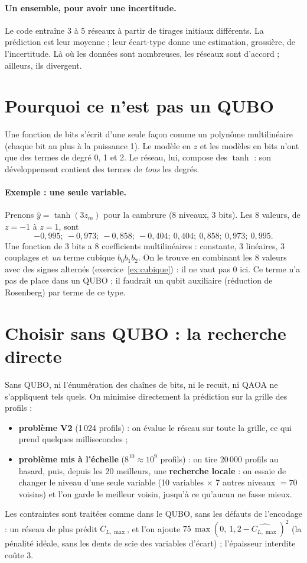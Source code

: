 \paragraph{Un ensemble, pour avoir une incertitude.} Le code entraîne 3 à 5 réseaux à partir de tirages initiaux différents. La prédiction est leur moyenne ; leur écart-type donne une estimation, grossière, de l'incertitude. Là où les données sont nombreuses, les réseaux sont d'accord ; ailleurs, ils divergent.

\section{Pourquoi ce n'est pas un QUBO}
Une fonction de bits s'écrit d'une seule façon comme un polynôme multilinéaire (chaque bit au plus à la puissance 1). Le modèle en $z$ et les modèles en bits n'ont que des termes de degré 0, 1 et 2. Le réseau, lui, compose des $\tanh$ : son développement contient des termes de \emph{tous} les degrés.

\paragraph{Exemple : une seule variable.} Prenons $\hat y=\tanh(3z_m)$ pour la cambrure (8 niveaux, 3 bits). Les 8 valeurs, de $z=-1$ à $z=1$, sont
\[ -0{,}995;\ -0{,}973;\ -0{,}858;\ -0{,}404;\ 0{,}404;\ 0{,}858;\ 0{,}973;\ 0{,}995. \]
Une fonction de 3 bits a 8 coefficients multilinéaires : constante, 3 linéaires, 3 couplages et \emph{un} terme cubique $b_0b_1b_2$. On le trouve en combinant les 8 valeurs avec des signes alternés (exercice~\ref{ex:cubique}) : il ne vaut pas 0 ici. Ce terme n'a pas de place dans un QUBO ; il faudrait un qubit auxiliaire (réduction de Rosenberg) par terme de ce type.

\section{Choisir sans QUBO : la recherche directe}
Sans QUBO, ni l'énumération des chaînes de bits, ni le recuit, ni QAOA ne s'appliquent tels quels. On minimise directement la prédiction sur la grille des profils :
\begin{itemize}
\item \textbf{problème V2} (1\,024 profils) : on évalue le réseau sur toute la grille, ce qui prend quelques millisecondes ;
\item \textbf{problème mis à l'échelle} ($8^{10}\approx10^9$ profils) : on tire 20\,000 profils au hasard, puis, depuis les 20 meilleurs, une \textbf{recherche locale} : on essaie de changer le niveau d'une seule variable (10 variables $\times$ 7 autres niveaux $=70$ voisins) et l'on garde le meilleur voisin, jusqu'à ce qu'aucun ne fasse mieux.
\end{itemize}
Les contraintes sont traitées comme dans le QUBO, sans les défauts de l'encodage : un réseau de plus prédit $C_{L,\max}$, et l'on ajoute $75\,\max(0,\ 1{,}2-\widehat{C_{L,\max}})^2$ (la pénalité idéale, sans les dents de scie des variables d'écart) ; l'épaisseur interdite coûte 3.

